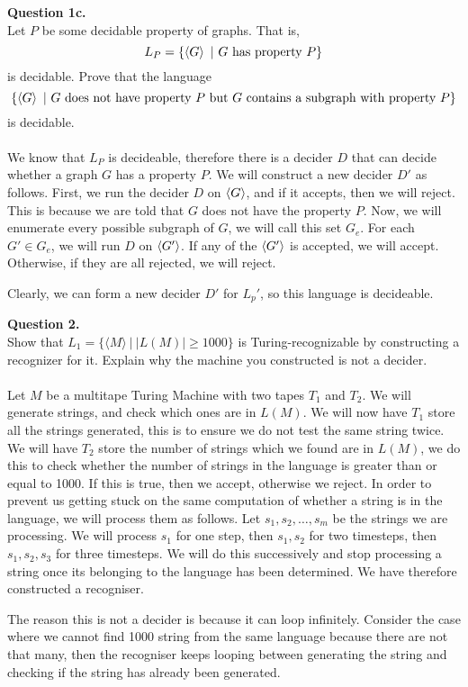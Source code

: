 \documentclass{article}
\newenvironment{question}[2]
{
    {\large \textbf{Question #1.}}\\
    #2\\\\
}{\newpage}
\begin{document}
\begin{question}
    {1c}
    {Let $P$ be some decidable property of graphs. That is,
        $$L_P = \{\braket{G} ~|~ G\text{ has property } P\}$$
        is decidable. Prove that the language
        $$\{\braket{G} ~|~ G \text{ does not have property }P \text{ but } G \text{ contains a subgraph with property }P\}$$ is decidable.}

    We know that $L_P$ is decideable, therefore there is a decider $D$ that can decide whether a graph $G$ has a property $P$. We will construct a new
    decider $D'$ as follows. First, we run the decider $D$ on $\braket{G}$, and if it accepts, then we will reject. This is because we are told that $G$ does
    not have the property $P$. Now, we will enumerate every possible subgraph of $G$, we will call this set $G_e$. For each $G' \in G_e$, we will run
    $D$ on $\braket{G'}$. If any of the $\braket{G'}$ is accepted, we will accept. Otherwise, if they are all rejected, we will reject.

    Clearly, we can form a new decider $D'$ for $L_{p}'$, so this language is decideable.
\end{question}

\begin{question}
    {2}
    {Show that $L_1 = \{\langle M\rangle ~|~ |L(M)| \geq 1000\}$ is Turing-recognizable
        by constructing a recognizer for it. Explain why the machine you constructed is not
        a decider.}

    Let $M$ be a multitape Turing Machine with two tapes $T_1$ and $T_2$. We will generate strings, and check which ones are in $L(M)$. We will now have
    $T_1$ store all the strings generated, this is to ensure we do not test the same string twice. We will have $T_2$ store the number of strings which we
    found are in $L(M)$, we do this to check whether the number of strings in the language is greater than or equal to 1000. If this is true, then we
    accept, otherwise we reject. In order to prevent us getting stuck on the same computation of whether a string is in the language, we will process
    them as follows. Let $s_1, s_2, \dots, s_m$ be the strings we are processing. We will process $s_1$ for one step, then
    $s_1, s_2$ for two timesteps, then $s_1, s_2, s_3$ for three timesteps. We will do this successively and stop processing a string once its belonging to
    the language has been determined. We have therefore constructed a recogniser.

    The reason this is not a decider is because it can loop infinitely. Consider the case where we cannot find 1000 string from the same language because
    there are not that many, then the recogniser keeps looping between generating the string and checking if the string has already been generated.
\end{question}
\end{document}
